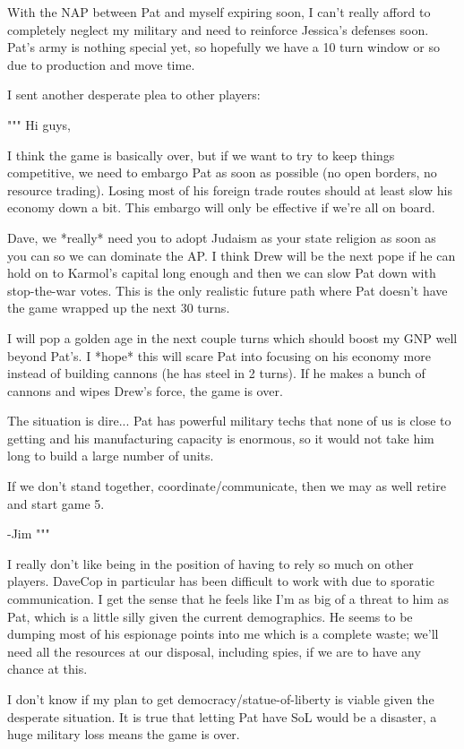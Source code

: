 \documentclass[10pt]{article}
\begin{document}
With the NAP between Pat and myself expiring soon, I can't really
afford to completely neglect my military and need to reinforce
Jessica's defenses soon. Pat's army is nothing special yet, so
hopefully we have a 10 turn window or so due to production and move
time.

I sent another desperate plea to other players:

"""
Hi guys,

I think the game is basically over, but if we want to try to keep
things competitive, we need to embargo Pat as soon as possible (no
open borders, no resource trading). Losing most of his foreign trade
routes should at least slow his economy down a bit. This embargo will
only be effective if we're all on board.

Dave, we *really* need you to adopt Judaism as your state religion as
soon as you can so we can dominate the AP. I think Drew will be the
next pope if he can hold on to Karmol's capital long enough and then
we can slow Pat down with stop-the-war votes. This is the only
realistic future path where Pat doesn't have the game wrapped up the
next 30 turns.

I will pop a golden age in the next couple turns which should boost my
GNP well beyond Pat's. I *hope* this will scare Pat into focusing on
his economy more instead of building cannons (he has steel in 2
turns). If he makes a bunch of cannons and wipes Drew's force, the
game is over.

The situation is dire... Pat has powerful military techs that none of
us is close to getting and his manufacturing capacity is enormous, so
it would not take him long to build a large number of units.

If we don't stand together, coordinate/communicate, then we may as well retire and start game 5.

-Jim
"""

I really don't like being in the position of having to rely so much on
other players. DaveCop in particular has been difficult to work with
due to sporatic communication. I get the sense that he feels like I'm
as big of a threat to him as Pat, which is a little silly given the
current demographics. He seems to be dumping most of his espionage
points into me which is a complete waste; we'll need all the resources
at our disposal, including spies, if we are to have any chance at
this.

I don't know if my plan to get democracy/statue-of-liberty is viable
given the desperate situation. It is true that letting Pat have SoL
would be a disaster, a huge military loss means the game is over.
\end{document}
